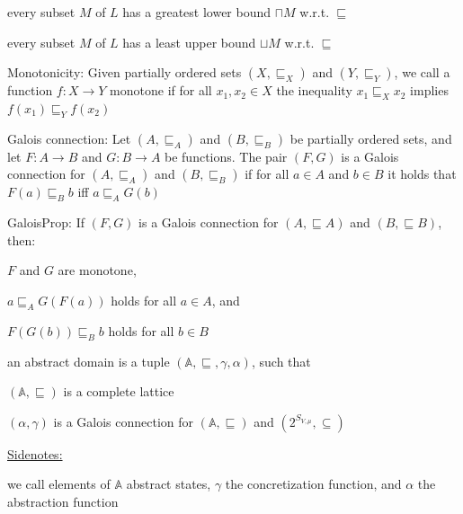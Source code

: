 \documentclass[landscape, a4paper]{article}
\begin{document}
\begin{minipage}[t]{0.2\linewidth}
\begin{betterlist}
\begin{betterlist}
			\item every subset $M$ of $L$ has a \alert{greatest lower bound} $\sqcap M$ w.r.t. $\sqsubseteq$
			\item every subset $M$ of $L$ has a \alert{least upper bound} $\sqcup M$ w.r.t. $\sqsubseteq$
			\item {}
		\end{betterlist}
		\item \alert{Monotonicity:} Given partially ordered sets $(X, \sqsubseteq_X)$ and $(Y, \sqsubseteq_Y)$, we call a function $f:X\rightarrow Y$ \alert{monotone} if for all $x_1, x_2 \in X$ the inequality $x_1 \sqsubseteq_X x_2$ implies $f(x_1) \sqsubseteq_Y f(x_2)$
		\begin{betterlist}
			\item {}
		\end{betterlist}
		\item \alert{Galois connection:} Let $(A, \sqsubseteq_A)$ and $(B, \sqsubseteq_B)$ be partially ordered sets, and let $F : A \rightarrow B$ and $G : B \rightarrow A$ be functions. The pair $(F, G)$ is a Galois connection for $(A, \sqsubseteq_A)$ and $(B, \sqsubseteq_B)$ if for all $a \in A$ and $b \in B$ it holds that $F(a) \sqsubseteq_B b$ iff $a \sqsubseteq_A G(b)$
		\item \alert{GaloisProp:} If $(F, G)$ is a \alert{Galois connection} for $(A, \sqsubseteq A)$ and $(B, \sqsubseteq B)$, then:
		\begin{betterlist}
			\item $F$ and $G$ are \alert{monotone},
			\item $a \sqsubseteq_A G(F(a))$ holds for all $a \in A$, and
			\item $F(G(b)) \sqsubseteq_B b$ holds for all $b \in B$
			\item \script{394}{Proof}
		\end{betterlist}
		\item an \alert{abstract domain} is a tuple $(\mathbb{A}, \sqsubseteq, \gamma, \alpha)$, such that
		\begin{betterlist}
			\item $(\mathbb{A}, \sqsubseteq)$ is a complete lattice
			\item $(\alpha, \gamma)$ is a Galois connection for $(\mathbb{A}, \sqsubseteq)$ and $(2^{S_{V ,\mu}}, \subseteq)$
			\item \underline{Sidenotes:}
			\begin{betterlist}
				\item we call elements of $\mathbb{A}$ \alert{abstract states}, $\gamma$ the \alert{concretization function}, and $\alpha$ the \alert{abstraction function}

\end{betterlist}
\end{betterlist}
\end{betterlist}
\end{minipage}
\end{document}
